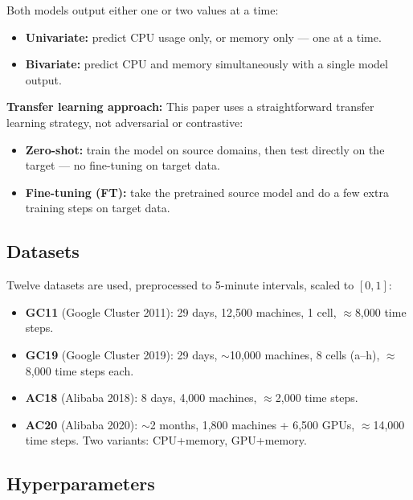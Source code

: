 \documentclass[12pt,a4paper]{article}
\begin{document}
Both models output either one or two values at a time:
\begin{itemize}
  \item \textbf{Univariate:} predict CPU usage only, or memory only --- one
        at a time.
  \item \textbf{Bivariate:} predict CPU and memory simultaneously with a
        single model output.
\end{itemize}

\textbf{Transfer learning approach:} This paper uses a straightforward
transfer learning strategy, not adversarial or contrastive:
\begin{itemize}
  \item \textbf{Zero-shot:} train the model on source domains, then test
        directly on the target --- no fine-tuning on target data.
  \item \textbf{Fine-tuning (FT):} take the pretrained source model and
        do a few extra training steps on target data.
\end{itemize}

\subsection{Datasets}

Twelve datasets are used, preprocessed to 5-minute intervals, scaled to
$[0,1]$:

\begin{itemize}
  \item \textbf{GC11} (Google Cluster 2011): 29 days, 12,500 machines,
        1 cell, $\approx$8,000 time steps.
  \item \textbf{GC19} (Google Cluster 2019): 29 days, $\sim$10,000 machines,
        8 cells (a--h), $\approx$8,000 time steps each.
  \item \textbf{AC18} (Alibaba 2018): 8 days, 4,000 machines, $\approx$2,000
        time steps.
  \item \textbf{AC20} (Alibaba 2020): $\sim$2 months, 1,800 machines + 6,500
        GPUs, $\approx$14,000 time steps. Two variants: CPU+memory, GPU+memory.
\end{itemize}

\subsection{Hyperparameters}
\end{document}
